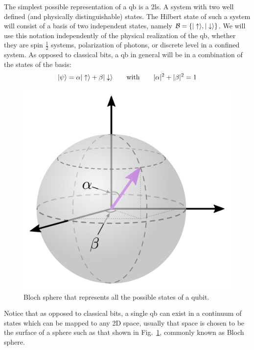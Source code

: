 The simplest possible representation of a \ac{qb} is a \ac{2ls}. A system with two well defined (and physically distinguishable) states. The Hilbert state of such a system will consist of a basis of two independent states, namely $\mathcal{B}=\{|\uparrow\rangle,|\downarrow\rangle\}$. We will use this notation independently of the physical realization of the \ac{qb}, whether they are spin $\tfrac{1}{2}$ systems, polarization of photons, or discrete level in a confined system.
As opposed to classical bits, a \ac{qb} in general will be in a combination of the states of the basis:
\begin{equation}
  |\psi\rangle = \alpha|\uparrow\rangle + \beta|\downarrow\rangle \qquad\text{with}\qquad
  |\alpha|^2+|\beta|^2 =1
\label{genstate}
\end{equation}
\begin{figure}[!h]
\centering
\includegraphics{chapter02/figures/bloch_sphere.pdf}
\vspace{-5pt}
\caption{Bloch sphere that represents all the possible states of a qubit.}
\label{Bsph}
\end{figure}
\FloatBarrier
Notice that as opposed to classical bits, a single \ac{qb} can exist in a continuum of states which can be mapped to any 2D space, usually that space is chosen to be the surface of a sphere such as that shown in Fig.~\ref{Bsph}, commonly known as Bloch sphere.

